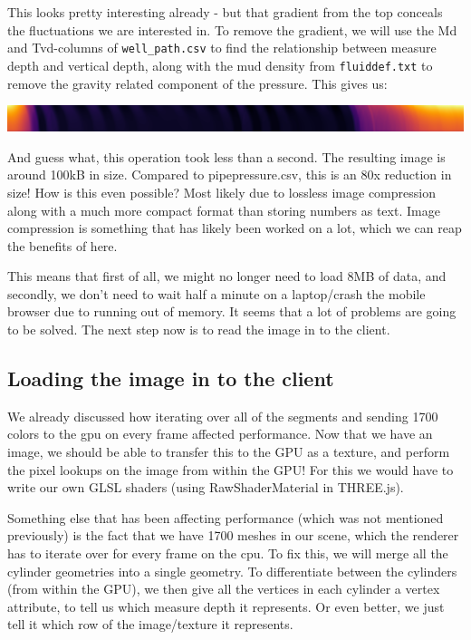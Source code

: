 This looks pretty interesting already - but that gradient from the top
conceals the fluctuations we are interested in. To remove the gradient,
we will use the Md and Tvd-columns of \texttt{well\_path.csv} to find
the relationship between measure depth and vertical depth, along with
the mud density from \texttt{fluiddef.txt} to remove the gravity related
component of the pressure. This gives us:

\includegraphics{pipepressure-2.png}

And guess what, this operation took less than a second. The resulting
image is around 100kB in size. Compared to pipepressure.csv, this is an
80x reduction in size! How is this even possible? Most likely due to
lossless image compression along with a much more compact format than
storing numbers as text. Image compression is something that has likely
been worked on a lot, which we can reap the benefits of here.

This means that first of all, we might no longer need to load 8MB of
data, and secondly, we don't need to wait half a minute on a
laptop/crash the mobile browser due to running out of memory. It seems
that a lot of problems are going to be solved. The next step now is to
read the image in to the client.

\hypertarget{loading-the-image-in-to-the-client}{%
\subsection{Loading the image in to the
client}\label{loading-the-image-in-to-the-client}}

We already discussed how iterating over all of the segments and sending
1700 colors to the gpu on every frame affected performance. Now that we
have an image, we should be able to transfer this to the GPU as a
texture, and perform the pixel lookups on the image from within the GPU!
For this we would have to write our own GLSL shaders (using
RawShaderMaterial in THREE.js).

Something else that has been affecting performance (which was not
mentioned previously) is the fact that we have 1700 meshes in our scene,
which the renderer has to iterate over for every frame on the cpu. To
fix this, we will merge all the cylinder geometries into a single
geometry. To differentiate between the cylinders (from within the GPU),
we then give all the vertices in each cylinder a vertex attribute, to
tell us which measure depth it represents. Or even better, we just tell
it which row of the image/texture it represents.

